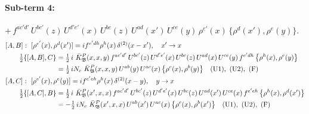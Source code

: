 \documentclass[10pt]{article}
\numberwithin{equation}{section}
\begin{document}
\paragraph{Sub-term 4:} $+\,f^{ac'd'}\,U^{bc'}(z)\,U^{d'e'}(x)\,U^{bc}(z)\,U^{ad}(x')\,U^{ce}(y)\,\rho^{e'}(x)\,\big\{\rho^{d}(x'),\rho^{e}(y)\big\}$.
\begin{align}
&[A,B]:\ [\rho^{e'}(x),\rho^{d}(x')]=i f^{e'dh}\rho^{h}(x)\,\delta^{(2)}(x-x'),\quad x'\to x\notag\\
&\qquad \tfrac12\{[A,B],C\}=\tfrac12\,i\,\,\bar K^{P}_{\mathfrak B}(x,x,y)\,f^{ac'd'}\,U^{bc'}(z)\,U^{d'e'}(x)\,U^{bc}(z)\,U^{ad}(x)\,U^{ce}(y)\,f^{e'dh}\,\big\{\rho^{h}(x),\rho^{e}(y)\big\}\notag\\
&\qquad\phantom{\tfrac12\{[A,B],C\}}=\tfrac12\,i N_{c}\,\,\bar K^{P}_{\mathfrak B}(x,x,y)\,U^{ab}(y)\,U^{ac}(x)\,\big\{\rho^{c}(x),\rho^{b}(y)\big\}\quad\text{(U1)},\ \text{(U2)},\ \text{(F)}
\label{eq:GII.I2.P-4-AB}\\
&[A,C]:\ [\rho^{e'}(x),\rho^{e}(y)]=i f^{e'eh}\rho^{h}(x)\,\delta^{(2)}(x-y),\quad y\to x\notag\\
&\qquad \tfrac12\{[A,C],B\}=\tfrac12\,i\,\,\bar K^{P}_{\mathfrak B}(x',x,x)\,f^{ac'd'}\,U^{bc'}(z)\,U^{d'e'}(x)\,U^{bc}(z)\,U^{ad}(x')\,U^{ce}(x)\,f^{e'eh}\,\big\{\rho^{h}(x),\rho^{d}(x')\big\}\notag\\
&\qquad\phantom{\tfrac12\{[A,C],B\}}=-\tfrac12\,i N_{c}\,\,\bar K^{P}_{\mathfrak B}(x',x,x)\,U^{ab}(x')\,U^{ac}(x)\,\big\{\rho^{c}(x),\rho^{b}(x')\big\}\quad\text{(U1)},\ \text{(U2)},\ \text{(F)}
\label{eq:GII.I2.P-4-AC}
\end{align}
\end{document}
